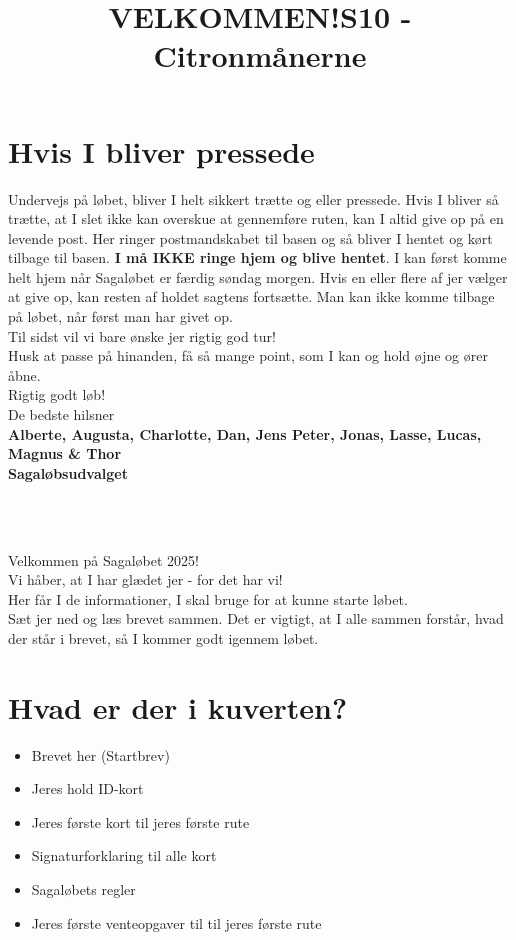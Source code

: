 \section{Hvis I bliver pressede}
Undervejs på løbet, bliver I helt sikkert trætte og eller pressede. Hvis I bliver så trætte, at I slet ikke kan overskue at gennemføre ruten, kan I altid give op på en levende post. Her ringer postmandskabet til basen og så bliver I hentet og kørt tilbage til basen. \textbf{I må IKKE ringe hjem og blive hentet}. I kan først komme helt hjem når Sagaløbet er færdig søndag morgen. Hvis en eller flere af jer vælger at give op, kan resten af holdet sagtens fortsætte. Man kan ikke komme tilbage på løbet, når først man har givet op.\\
\newline
Til sidst vil vi bare ønske jer rigtig god tur!\\
Husk at passe på hinanden, få så mange point, som I kan og hold øjne og ører åbne.\\
\newline
Rigtig godt løb!\\
\newline
\textcolor{søblå}{De bedste hilsner}\\
\textcolor{natblå}{\textbf{Alberte, Augusta, Charlotte, Dan, Jens Peter, Jonas, Lasse, Lucas, Magnus \& Thor}}\\
\textcolor{natblå}{\textbf{Sagaløbsudvalget}}\\
\newpage
\title{VELKOMMEN!}\\
\newline
\title{\textcolor{flammefarvet}{S10 - Citronmånerne }}\\
\newline
Velkommen på Sagaløbet 2025!\\
Vi håber, at I har glædet jer - for det har vi!\\
Her får I de informationer, I skal bruge for at kunne starte løbet.\\
Sæt jer ned og læs brevet sammen. Det er vigtigt, at I alle sammen forstår, hvad der står i brevet, så I kommer godt igennem løbet.
\section{Hvad er der i kuverten?}
\begin{itemize}
    \item Brevet her (Startbrev)
    \item Jeres hold ID-kort
    \item Jeres første kort til jeres første rute
    \item Signaturforklaring til alle kort
    \item Sagaløbets regler
    \item Jeres første venteopgaver til til jeres første rute
\end{itemize}
